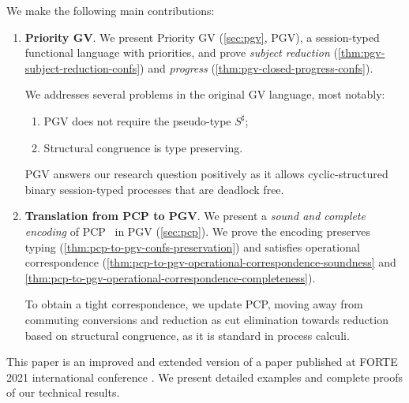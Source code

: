 We make the following main contributions:
\begin{enumerate}
  \item \textbf{Priority GV}. We present Priority GV (\cref{sec:pgv}, PGV), a session-typed functional language with priorities, and prove \emph{subject reduction} (\cref{thm:pgv-subject-reduction-confs}) and \emph{progress} (\cref{thm:pgv-closed-progress-confs}).

        We addresses several problems in the original GV language, most notably:
        \begin{enumerate}
          \item PGV does not require the pseudo-type $S^\sharp$;
          \item Structural congruence is type preserving.
        \end{enumerate}
        PGV answers our research question positively as it allows cyclic-structured binary session-typed processes that are deadlock free.
  \item \textbf{Translation from PCP to PGV}.
        We present a \emph{sound and complete encoding} of PCP~\cite{dardhagay18extended} in PGV (\cref{sec:pcp}). We prove the encoding preserves typing (\cref{thm:pcp-to-pgv-confs-preservation}) and satisfies operational correspondence (\cref{thm:pcp-to-pgv-operational-correspondence-soundness} and \cref{thm:pcp-to-pgv-operational-correspondence-completeness}).

        To obtain a tight correspondence, we update PCP, moving away from commuting conversions and reduction as cut elimination towards reduction based on structural congruence, as it is standard in process calculi.
\end{enumerate}

This paper is an improved and extended version of a paper published at FORTE 2021 international conference \cite{kokkedardha21pgv}. We present detailed examples and complete proofs of our technical results.
